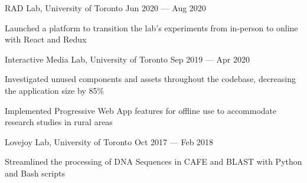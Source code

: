 \begin{cventries}
  \cventry
    {}
    {RAD Lab, University of Toronto}
    {}
    {Jun 2020 --- Aug 2020}
    {}
    {
      \begin{cvitems}
        \item {Launched a platform to transition the lab's experiments from in-person to online with React and Redux}
      \end{cvitems}
    }
  \cventry
    {}
    {Interactive Media Lab, University of Toronto}
    {}
    {Sep 2019 --- Apr 2020}
    {}
    {
      \begin{cvitems}
        \item {Investigated unused components and assets throughout the codebase, decreasing the application size by 85\% }
        \item {Implemented Progressive Web App features for offline use to accommodate research studies in rural areas}
      \end{cvitems}
    }
  \cventry
    {}
    {Lovejoy Lab, University of Toronto}
    {}
    {Oct 2017 --- Feb 2018}
    {}
    {
      \begin{cvitems}
        \item {Streamlined the processing of DNA Sequences in CAFE and BLAST with Python and Bash scripts}
      \end{cvitems}
    }
\end{cventries}